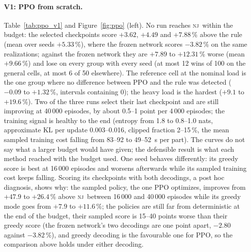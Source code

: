 \documentclass[11pt,a4paper]{article}
\theoremstyle{plain}
\theoremstyle{definition}
\theoremstyle{remark}
\newcommand{\nj}{\textsc{nj}}
\begin{document}
\paragraph{V1: PPO from scratch.}
Table~\ref{tab:ppo_v1} and Figure~\ref{fig:ppo} (left). No run reaches \nj\ within the
budget: the selected checkpoints score $+3.62$, $+4.49$ and $+7.88$\,\% above the rule
(mean over seeds $+5.33$\,\%), where the frozen network scores $-3.82$\,\% on the same
realizations; against the frozen network they are $+7.89$ to $+12.31$\,\% worse (mean
$+9.66$\,\%) and lose on every group with every seed (at most 12 wins of 100 on the
general cells, at most 6 of 50 elsewhere). The reference cell at the nominal load is the
one group where no difference between PPO and the rule was detected ($-0.09$ to $+1.32$\,\%, intervals containing 0);
the heavy load is the hardest ($+9.1$ to $+19.6$\,\%). Two of the three runs select
their last checkpoint and are still improving at 40\,000 episodes, by about 0.5--1
point per 4\,000 episodes; the training signal is healthy to the end (entropy from
1.8 to 0.8--1.0 nats, approximate KL per update 0.003--0.016, clipped fraction
2--15\,\%, the mean sampled training cost falling from 83--92 to 49--52~s per part). The
curves do not say what a larger budget would have given; the defensible result is what
each method reached with the budget used. One seed
behaves differently: its greedy score is best at 16\,000 episodes and worsens afterwards
while its sampled training cost keeps falling. Scoring its checkpoints with both
decodings, a post hoc diagnosis, shows why: the sampled policy, the one PPO optimizes, improves from $+47.9$ to
$+26.4$\,\% above \nj\ between 16\,000 and 40\,000 episodes while its greedy mode goes
from $+7.9$ to $+11.6$\,\%; the policies are still far from deterministic at the end of
the budget, their sampled score is 15--40 points worse than their greedy score (the
frozen network's two decodings are one point apart, $-2.80$ against $-3.82$\,\%), and
greedy decoding is the favourable one for PPO, so the comparison above holds under
either decoding.

\begin{table}[t]
\centering
\caption{V1, PPO from scratch: paired evaluation of the selected checkpoints on the
validation groups (design mode, 50 realizations per group, 100 general cells; greedy
decoding). Paired $\Delta$ vs \nj\ and vs the frozen expert-iteration network [\%, 95\,\% CI,
wins out of $n$]; score = mean of the four groups. The frozen network's row reproduces
Table~\ref{tab:sfruns}.}
\label{tab:ppo_v1}
\resizebox{\linewidth}{!}{}
\end{table}
\end{document}
